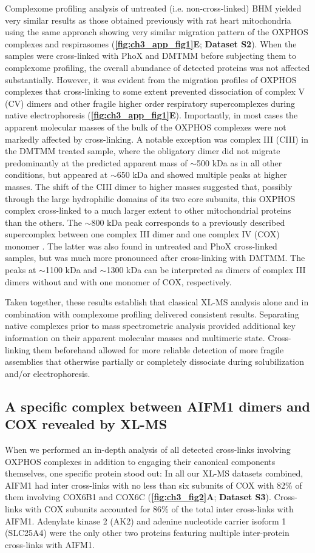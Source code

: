 Complexome profiling analysis of untreated (i.e. non-cross-linked) BHM yielded very similar results as those obtained previously with rat heart mitochondria using the same approach \cite{RN15} showing very similar migration pattern of the OXPHOS complexes and respirasomes (\textbf{\autoref{fig:ch3_app_fig1}E}; \textbf{Dataset S2}). When the samples were cross-linked with PhoX and DMTMM before subjecting them to complexome profiling, the overall abundance of detected proteins was not affected substantially. However, it was evident from the migration profiles of OXPHOS complexes that cross-linking to some extent prevented dissociation of complex V (CV) dimers and other fragile higher order respiratory supercomplexes during native electrophoresis (\textbf{\autoref{fig:ch3_app_fig1}E}). Importantly, in most cases the apparent molecular masses of the bulk of the OXPHOS complexes were not markedly affected by cross-linking. A notable exception was complex III (CIII) in the DMTMM treated sample, where the obligatory dimer did not migrate predominantly at the predicted apparent mass of $\sim$500 kDa as in all other conditions, but appeared at $\sim$650 kDa and showed multiple peaks at higher masses. The shift of the CIII dimer to higher masses suggested that, possibly through the large hydrophilic domains of its two core subunits, this OXPHOS complex cross-linked to a much larger extent to other mitochondrial proteins than the others. The $\sim$800 kDa peak corresponds to a previously described supercomplex between one complex III dimer and one complex IV (COX) monomer \cite{RN28}. The latter was also found in untreated and PhoX cross-linked samples, but was much more pronounced after cross-linking with DMTMM. The peaks at $\sim$1100 kDa and $\sim$1300 kDa can be interpreted as dimers of complex III dimers without and with one monomer of COX, respectively.

Taken together, these results establish that classical XL-MS analysis alone and in combination with complexome profiling delivered consistent results. Separating native complexes prior to mass spectrometric analysis provided additional key information on their apparent molecular masses and multimeric state. Cross-linking them beforehand allowed for more reliable detection of more fragile assemblies that otherwise partially or completely dissociate during solubilization and/or electrophoresis.

\subsection*{A specific complex between AIFM1 dimers and COX revealed by XL-MS}
When we performed an in-depth analysis of all detected cross-links involving OXPHOS complexes in addition to engaging their canonical components themselves, one specific protein stood out: In all our XL-MS datasets combined, AIFM1 had inter cross-links with no less than six subunits of COX with 82\% of them involving COX6B1 and COX6C (\textbf{\autoref{fig:ch3_fig2}A}; \textbf{Dataset S3}). Cross-links with COX subunits accounted for 86\% of the total inter cross-links with AIFM1. Adenylate kinase 2 (AK2) and adenine nucleotide carrier isoform 1 (SLC25A4) were the only other two proteins featuring multiple inter-protein cross-links with AIFM1.

